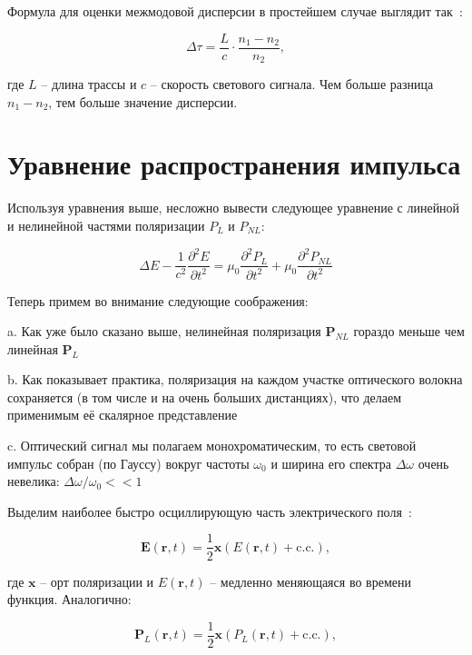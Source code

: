 Формула для оценки межмодовой дисперсии в простейшем случае выглядит так~\cite{agrawal2007nonlinear}:

\begin{equation}
	\Delta \tau = \frac{L}{c} \cdot \frac{n_1 - n_2}{n_2},
\end{equation}

где $L$ -- длина трассы и $c$ -- скорость светового сигнала. Чем больше разница $n_1 - n_2$, тем больше значение дисперсии.

\section{Уравнение распространения импульса}

Используя уравнения выше, несложно вывести следующее уравнение с линейной и нелинейной частями поляризации $P_L$ и $P_{NL}$:

\begin{equation}
	\Delta E - \frac{1}{c^2}\frac{\partial^2 E}{\partial t^2} = \mu_0 \frac{\partial^2 P_L}{\partial t^2} + \mu_0 \frac{\partial^2 P_{NL}}{\partial t^2}
\end{equation}

Теперь примем во внимание следующие соображения:

a. Как уже было сказано выше, нелинейная поляризация $\mathbf{P}_{NL}$ гораздо меньше чем линейная $\mathbf{P}_{L}$

b. Как показывает практика, поляризация на каждом участке оптического волокна сохраняется (в том числе и на очень больших дистанциях), что делаем применимым её скалярное представление

c. Оптический сигнал мы полагаем монохроматическим, то есть световой импульс собран (по Гауссу) вокруг частоты $\omega_0$ и ширина его спектра $\Delta \omega$ очень невелика: $\Delta \omega / \omega_0 << 1$

Выделим наиболее быстро осциллирующую часть электрического поля~\cite{agrawal2007nonlinear}:

\begin{equation}
	\mathbf{E}(\mathbf{r}, t) = \frac{1}{2}\mathbf{x}\left( E(\mathbf{r}, t) + \text{c.c.} \right),
\end{equation}

где $\mathbf{x}$ -- орт поляризации и $E(\mathbf{r}, t)$ -- медленно меняющаяся во времени функция. Аналогично:

\begin{equation}
	\mathbf{P}_L(\mathbf{r}, t) = \frac{1}{2}\mathbf{x}\left( P_L(\mathbf{r}, t) + \text{c.c.} \right),
\end{equation}

